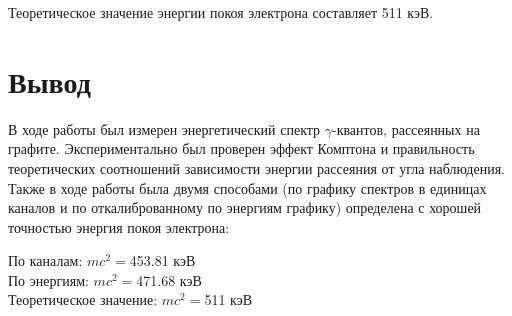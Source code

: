 \documentclass[a4paper]{article}
\begin{document}
Теоретическое значение энергии покоя электрона составляет 511 кэВ.

\section{Вывод}

В ходе работы был измерен энергетический спектр  $\gamma$-квантов, рассеянных на графите. Экспериментально был проверен эффект Комптона и правильность теоретических соотношений зависимости энергии рассеяния от угла наблюдения. Также в ходе работы была двумя способами (по графику спектров в единицах каналов и по откалиброванному по энергиям графику) определена с хорошей точностью энергия покоя электрона:
\begin{center}
    По каналам: $mc^2 = $453.81 кэВ \\
    По энергиям: $mc^2 = $471.68 кэВ \\
    Теоретическое значение: $mc^2 = $511 кэВ \\
\end{center}
\end{document}
